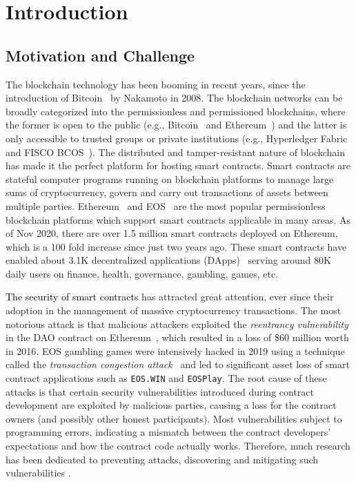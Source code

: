 
\chapter{Introduction} %
\label{ch:introduction} %
\section{Motivation and Challenge}
The blockchain technology has been booming in recent years, since the introduction of Bitcoin~\cite{nakamoto2008bitcoin} by Nakamoto in 2008.
The blockchain networks can be broadly categorized into the permissionless and permissioned blockchains, where the former is open to the public (e.g.,
Bitcoin~\cite{nakamoto2008bitcoin} and Ethereum~\cite{Ethereum}) and the latter is only accessible to trusted groups or private institutions (e.g., Hyperledger Fabric~\cite{hyperledger-fabric} and FISCO BCOS~\cite{fisco}).
The distributed and tamper-resistant nature of blockchain has made it the perfect platform for hosting smart contracts.
Smart contracts are stateful computer programs running on blockchain platforms to manage large sums of
cryptocurrency, govern and carry out transactions of assets between multiple parties.
Ethereum~\cite{Ethereum} and EOS~\cite{EOS} are the most popular permissionless blockchain platforms which
support smart contracts applicable in many areas.
As of Nov 2020, there are over 1.5 million smart contracts deployed on Ethereum, which is a 100 fold increase since just two years ago.
These smart contracts have enabled about 3.1K decentralized applications (DApps)~\cite{dapp-stats}
serving around 80K daily users on finance, health, governance, gambling, games, etc.


\textcolor{black}{The security of smart contracts} has attracted great attention, ever since their adoption in the management of massive cryptocurrency transactions.
The most notorious attack is that malicious attackers exploited the \emph{reentrancy vulnerability} in the DAO contract on Ethereum~\cite{DAO_attacks}, which resulted in
a loss of \$60 million worth in 2016.
EOS gambling games were intensively hacked in 2019 using a technique called the \emph{transaction congestion attack}~\cite{EOS_attacks} and led
to significant asset loss of smart contract applications such as \texttt{EOS.WIN} and \texttt{EOSPlay}.
The root cause of these attacks is that certain security vulnerabilities introduced during contract development are exploited by malicious parties, causing a loss for the contract owners (and possibly other honest participants).
Most vulnerabilities subject to programming errors, indicating a mismatch between the contract developers' expectations and how the contract code actually works.
Therefore, much research has been dedicated to preventing attacks, discovering and mitigating such vulnerabilities .

